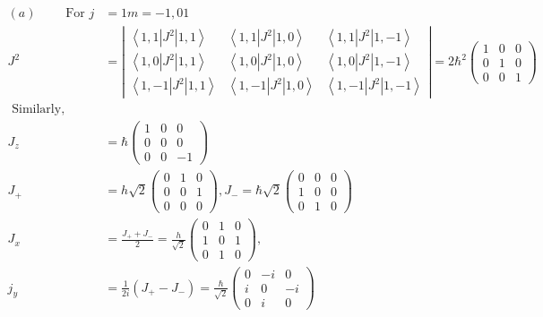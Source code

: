 \begin{answer}
	\begin{align*}
	 (a)\qquad\text{ For }j&=1 m=-1,01\\
	 J^{2}&=\left|\begin{array}{ccc}
	 \left\langle 1,1\left|J^{2}\right| 1,1\right\rangle & \left\langle 1,1\left|J^{2}\right| 1,0\right\rangle & \left\langle 1,1\left|J^{2}\right| 1,-1\right\rangle \\
	 \left\langle 1,0\left|J^{2}\right| 1,1\right\rangle & \left\langle 1,0\left|J^{2}\right| 1,0\right\rangle & \left\langle 1,0\left|J^{2}\right| 1,-1\right\rangle \\
	 \left\langle 1,-1\left|J^{2}\right| 1,1\right\rangle & \left\langle 1,-1\left|J^{2}\right| 1,0\right\rangle & \left\langle 1,-1\left|J^{2}\right| 1,-1\right\rangle
	 \end{array}\right|=2 \hbar^{2}\left(\begin{array}{ccc}
	 1 & 0 & 0 \\
	 0 & 1 & 0 \\
	 0 & 0 & 1
	 \end{array}\right)\\
	 \text{ Similarly,}\\
	 J_{z}&=\hbar\left(\begin{array}{ccc}
	 1 & 0 & 0 \\
	 0 & 0 & 0 \\
	 0 & 0 & -1
	 \end{array}\right)\\
	 J_{+}&=h \sqrt{2}\left(\begin{array}{lll}
	 0 & 1 & 0 \\
	 0 & 0 & 1 \\
	 0 & 0 & 0
	 \end{array}\right), J_{-}=\hbar \sqrt{2}\left(\begin{array}{lll}
	 0 & 0 & 0 \\
	 1 & 0 & 0 \\
	 0 & 1 & 0
	 \end{array}\right)\\
	 J_{x}&=\frac{J_{+}+J_{-}}{2}=\frac{h}{\sqrt{2}}\left(\begin{array}{lll}
	 0 & 1 & 0 \\
	 1 & 0 & 1 \\
	 0 & 1 & 0
	 \end{array}\right),\\
	  j_{y}&=\frac{1}{2 i}\left(J_{+}-J_{-}\right)=\frac{\hbar}{\sqrt{2}}\left(\begin{array}{ccc}
	 0 & -i & 0 \\
	 i & 0 & -i \\
	 0 & i & 0
	 \end{array}\right)
	\end{align*}	
\end{answer}
